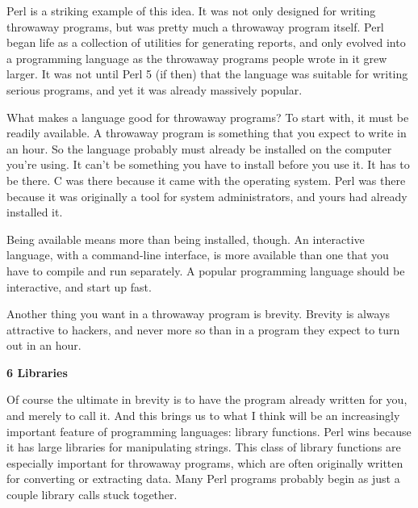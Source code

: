 Perl is
                  a striking example of this idea. It was not only designed for
                  writing throwaway programs, but was pretty much a throwaway
                  program itself. Perl began life as a collection of utilities
                  for generating reports, and only evolved into a programming
                  language as the throwaway programs people wrote in it grew
                  larger. It was not until Perl 5 (if then) that the language
                  was suitable for writing serious programs, and yet it was
                  already massively popular.

What makes a language
                  good for throwaway programs? To start with, it must be readily
                  available. A throwaway program is something that you expect to
                  write in an hour. So the language probably must already be
                  installed on the computer you're using. It can't be something
                  you have to install before you use it. It has to be there. C
                  was there because it came with the operating system. Perl was
                  there because it was originally a tool for system
                  administrators, and yours had already installed it.

Being
                  available means more than being installed, though. An
                  interactive language, with a command-line interface, is more
                  available than one that you have to compile and run
                  separately. A popular programming language should be
                  interactive, and start up fast.

Another thing you
                  want in a throwaway program is brevity. Brevity is always
                  attractive to hackers, and never more so than in a program
                  they expect to turn out in an hour.

\textbf{6 Libraries}

Of course the ultimate in brevity is to have the
                  program already written for you, and merely to call it. And
                  this brings us to what I think will be an increasingly
                  important feature of programming languages: library functions.
                  Perl wins because it has large libraries for manipulating
                  strings. This class of library functions are especially
                  important for throwaway programs, which are often originally
                  written for converting or extracting data. Many Perl programs
                  probably begin as just a couple library calls stuck
                  together.

